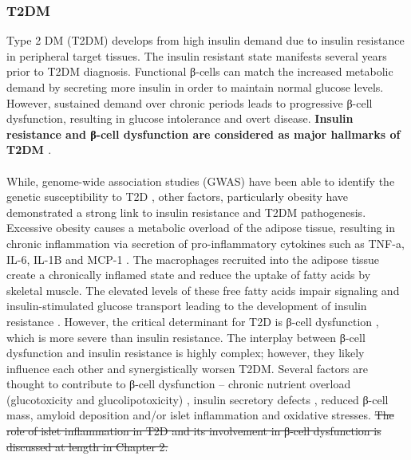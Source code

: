 \subsubsection{T2DM}

Type 2 DM (T2DM) develops from high insulin demand due to insulin resistance in peripheral target tissues. The insulin resistant state manifests several years prior to T2DM diagnosis. Functional β-cells can match the increased metabolic demand by secreting more insulin in order to maintain normal glucose levels. However, sustained demand over chronic periods leads to progressive β-cell dysfunction, resulting in glucose intolerance and overt disease. \textbf{Insulin resistance and β-cell dysfunction are considered as major hallmarks of T2DM \cite{banday_pathophysiology_2020}}. 
\\\\
While, genome-wide association studies (GWAS) have been able to identify the genetic susceptibility to T2D \textbf{\cite{grarup_genetic_2014, wang_genetic_2016}}, other factors, particularly obesity have demonstrated a strong link to insulin resistance and T2DM pathogenesis. Excessive obesity causes a metabolic overload of the adipose tissue, resulting in chronic inflammation via secretion of pro-inflammatory cytokines such as TNF-a, IL-6, IL-1B and MCP-1 \textbf{\cite{guilherme_adipocyte_2008}}. The macrophages recruited into the adipose tissue create a chronically inflamed state and reduce the uptake of fatty acids by skeletal muscle. The elevated levels of these free fatty acids impair signaling and insulin-stimulated glucose transport leading to the development of insulin resistance \textbf{\cite{unger_lipotoxicity_1995,uysal_protection_1997,kanda_mcp-1_2006}}. However, the critical determinant for T2D is β-cell dysfunction \textbf{\cite{tahrani_glycaemic_2010, khin_pancreatic_2023}}, which is more severe than insulin resistance. The interplay between β-cell dysfunction and insulin resistance is highly complex; however, they likely influence each other and synergistically worsen T2DM.  Several factors are thought to contribute to β-cell dysfunction – chronic nutrient overload (glucotoxicity and glucolipotoxicity) \textbf{\cite{prentki_nutrient-induced_2020}}, insulin secretory defects \textbf{\cite{kahn_mechanisms_2006}}, reduced β-cell mass, amyloid deposition \textbf{\cite{prentki_islet_2006}} and/or islet inflammation and oxidative stresses. \st{The role of islet inflammation in T2D and its involvement in β-cell dysfunction is discussed at length in Chapter 2.}
\\\\
